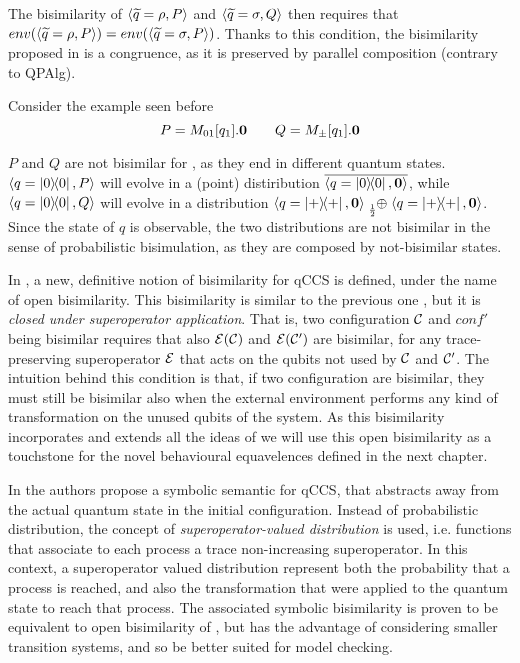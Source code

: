 The bisimilarity of $\langle\widetilde{q} = \rho, P\rangle $ and $\langle\widetilde{q} = 	\sigma, Q\rangle$ then requires that 
$env(\langle\widetilde{q} = \rho, P\rangle) = env(\langle\widetilde{q} = \sigma, P\rangle)$. Thanks to this condition, the bisimilarity proposed in \cite{fengBisimulationQuantumProcesses2012} is a congruence, as it is preserved by parallel composition (contrary to QPAlg).


Consider the example seen before 
\[P = M_{01}[q_1].\mathbf{0} \qquad Q = M_\pm[q_1].\mathbf{0} \]

$P$ and $Q$ are not bisimilar for \cite{fengProbabilisticBisimulationsQuantum2007, fengBisimulationQuantumProcesses2012, dengOpenBisimulationQuantum2012} , as they end in different quantum states. $\langle q = \ket{0}\!\!\bra{0}, P\rangle$ will evolve in a (point) distiribution $\overline{\langle q = \ket{0}\!\!\bra{0}, \mathbf{0}\rangle}$, while $\langle q = \ket{0}\!\!\bra{0}, Q\rangle$ will evolve in a distribution $\confw{q = \proj{+}, \nil} \psum{\frac{1}{2}} \confw{q = \proj{+}, \nil}$. Since the state of $q$ is observable, the two distributions are not bisimilar in the sense of probabilistic bisimulation, as they are composed by not-bisimilar states.

In \cite{dengOpenBisimulationQuantum2012}, a new, definitive notion of bisimilarity for qCCS is defined, under the name of open bisimilarity. This bisimilarity is similar to the previous one \cite{fengBisimulationQuantumProcesses2012}, but it is \textit{closed under superoperator application}. That is, two configuration $\mathcal{C}$ and $conf'$ being bisimilar requires that also $\mathcal{E}(\mathcal{C})$ and $\mathcal{E}(\mathcal{C}')$ are bisimilar, for any trace-preserving superoperator $\mathcal{E}$ that acts on the qubits not used by $\mathcal{C}$ and $\mathcal{C}'$. The intuition behind this condition is that, if two configuration are bisimilar, they must still be bisimilar also when the external environment performs any kind of transformation on the unused qubits of the system. As this bisimilarity incorporates and extends all the ideas of \cite{fengBisimulationQuantumProcesses2012, yingAlgebraQuantumProcesses2010, fengBisimulationQuantumProcesses2012} we will use this open bisimilarity as a touchstone for the novel behavioural equavelences defined in the next chapter.


In \cite{fengSymbolicBisimulationQuantum2014} the authors propose a symbolic semantic for qCCS, that abstracts away from the actual quantum state in the initial configuration. Instead of probabilistic distribution, the concept of \textit{superoperator-valued distribution} is used, i.e. functions that associate to each process a trace non-increasing superoperator. In this context, a superoperator valued distribution represent both the probability that a process is reached, and also the transformation that were applied to the quantum state to reach that process. The associated symbolic bisimilarity is proven to be equivalent to open bisimilarity of \cite{dengOpenBisimulationQuantum2012}, but has the advantage of considering smaller transition systems, and so be better suited for model checking.  


